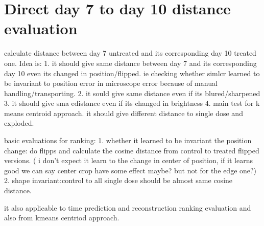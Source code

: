\section{Direct day 7 to day 10 distance evaluation}
calculate distance between day 7 untreated and its corresponding day 10 treated one.
Idea is:
1. it should give same distance between day 7 and its corresponding day 10
 even its changed in position/flipped. ie checking whether simlcr learned to 
 be invariant to position error in microscope error because of manual 
 handling/transporting.
2. it sould give same distance even if its blured/sharpened
3. it should give sma edistance even if its changed in brightness
4. main test for k means centroid approach. it should give different distance to single dose and exploded.


basic evaluations for ranking:
1.
whether it learned to be invariant the position change:
do flipps and calculate the cosine distance from control to treated flipped versions. ( i don't expect it learn to the change in center of position, 
if it learns good we can say center crop have some effect maybe? but not for the edge one?)
2. 
shape invariant:control to all single dose should be almost same cosine distance.

it also applicable to time prediction and reconstruction ranking evaluation and also from kmeans centriod approach.